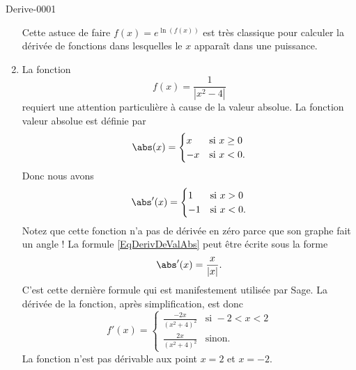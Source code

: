 \begin{corrige}{Derive-0001}
\begin{enumerate}
		Cette astuce de faire $f(x)= e^{\ln (f(x)) }$ est très classique pour calculer la dérivée de fonctions dans lesquelles le $x$ apparaît dans une puissance.
	\item
		La fonction 
		\begin{equation}
			f(x)=\frac{1}{ | x^2-4 | }
		\end{equation}
		requiert une attention particulière à cause de la valeur absolue. La fonction valeur absolue est définie par
		\begin{equation}
			\abs(x)=\begin{cases}
				x	&	\text{si }x\geq 0\\
				-x	&	 \text{si }x<0.
			\end{cases}
		\end{equation}
		Donc nous avons
		\begin{equation}		\label{EqDerivDeValAbs}
			\abs'(x)=\begin{cases}
				1	&	\text{si }x>0\\
				-1	&	 \text{si }x<0.
			\end{cases}
		\end{equation}
		Notez que cette fonction n'a pas de dérivée en zéro parce que son graphe fait un angle ! La formule \eqref{EqDerivDeValAbs} peut être écrite sous la forme
		\begin{equation}
			\abs'(x)=\frac{ x }{ | x | }.
		\end{equation}
		C'est cette dernière formule qui est manifestement utilisée par Sage. La dérivée de la fonction, après simplification, est donc
		\begin{equation}
			f'(x)=\begin{cases}
				\frac{ -2x }{ (x^2+4)^2 }	&	\text{si }-2<x<2\\
				\frac{ 2x }{ (x^2+4)^2 }	&	 \text{sinon}.
			\end{cases}
		\end{equation}
		La fonction n'est pas dérivable aux point $x=2$ et $x=-2$.
\end{enumerate}

\end{corrige}
